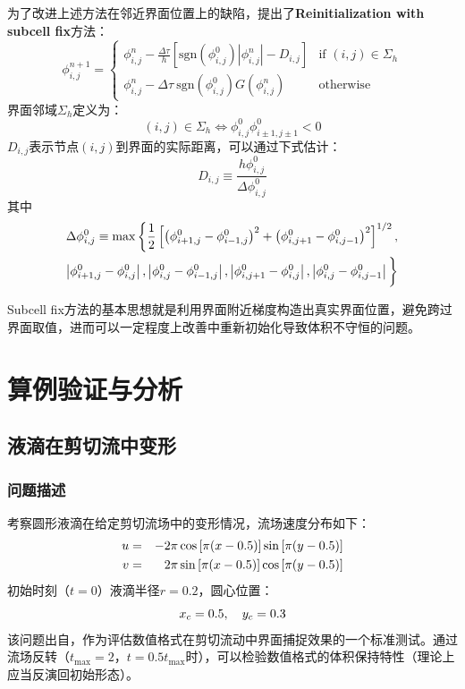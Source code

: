 \documentclass[11pt]{article}
\begin{document}
为了改进上述方法在邻近界面位置上的缺陷，\citet{russo_remark_2000}提出了\textbf{Reinitialization with subcell fix}方法：
\begin{equation}
    \phi^{n+1}_{i,j}=\left\{\begin{array}{ll}
        \phi^n_{i,j}-\frac{\Delta \tau}{h}\left[\mathrm{sgn}\left(\phi^0_{i,j}\right)|\phi^n_{i,j}|-D_{i,j}\right] & \text{if\ }\left(i,j\right)\in\Sigma_{h} \\
        \phi^n_{i,j}-\Delta\tau\ \mathrm{sgn}\left(\phi^0_{i,j}\right)G\left(\phi^n_{i,j}\right)                   & \text{otherwise}
    \end{array}\right.
\end{equation}
界面邻域$\Sigma_h$定义为：
\begin{equation}
    \left(i,j\right)\in\Sigma_{h}\Longleftrightarrow \phi^0_{i,j}\phi^0_{i\pm1,j\pm1}<0
\end{equation}
$D_{i,j}$表示节点$(i,j)$到界面的实际距离，可以通过下式估计：
\begin{equation}
    D_{i,j}\equiv\frac{h\phi^0_{i,j}}{\Delta\phi^0_{i,j}}
\end{equation}
其中
\begin{eqnarray}
    \Delta\phi^0_{i,j}\equiv\max\bigg\{
    \frac{1}{2}\left[\left(\phi^0_{i+1,j}-\phi^0_{i-1,j}\right)^2+\left(\phi^0_{i,j+1}-\phi^0_{i,j-1}\right)^2\right]^{1/2},\notag\\
    \left|\phi^0_{i+1,j}-\phi^0_{i,j}\right|,\left|\phi^0_{i,j}-\phi^0_{i-1,j}\right|,
    \left|\phi^0_{i,j+1}-\phi^0_{i,j}\right|,\left|\phi^0_{i,j}-\phi^0_{i,j-1}\right|
    \bigg\}
\end{eqnarray}

Subcell fix方法的基本思想就是利用界面附近梯度构造出真实界面位置，避免跨过界面取值，进而可以一定程度上改善\citep{sussman_level_1994}中重新初始化导致体积不守恒的问题。

\newpage
\section{算例验证与分析}
\subsection{液滴在剪切流中变形}
\subsubsection{问题描述}
考察圆形液滴在给定剪切流场中的变形情况，流场速度分布如下：
\begin{eqnarray}
    u&=&-2\pi\cos\left[\pi(x-0.5)\right]\sin\left[\pi(y-0.5)\right] \notag\\
    v&=&2\pi\sin\left[\pi(x-0.5)\right]\cos\left[\pi(y-0.5)\right] \notag
\end{eqnarray}
初始时刻（$t=0$）液滴半径$r=0.2$，圆心位置：
\begin{equation}
    x_c=0.5,\quad y_c=0.3 \notag
\end{equation}
该问题出自\citep{rider_stretching_1995}，作为评估数值格式在剪切流动中界面捕捉效果的一个标准测试。通过流场反转（$t_\text{max}=2$，$t=0.5t_\text{max}$时），可以检验数值格式的体积保持特性（理论上应当反演回初始形态）。
\end{document}
